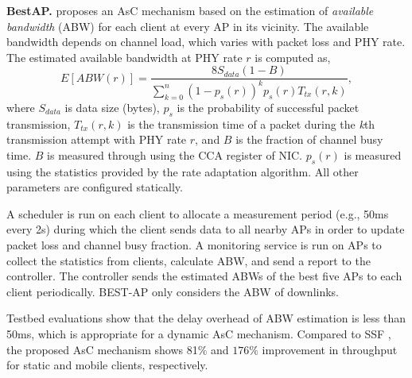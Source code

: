 \textbf{BestAP.}
\label{BEST-AP}
\cite{BEST-AP} proposes an AsC mechanism based on the estimation of \textit{available bandwidth} (ABW) for each client at every AP in its vicinity. 
The available bandwidth depends on channel load, which varies with packet loss and PHY rate. 
The estimated available bandwidth at PHY rate $r$ is computed as,
%
\begin{equation}
E[ABW(r)]=\frac{8S_{data}(1-B)}{\sum_{k=0}^{n}(1-p_s(r))^kp_s(r)T_{tx}(r,k)},
\end{equation}
%
where $S_{data}$ is data size (bytes), $p_s$ is the probability of successful packet transmission, $T_{tx}(r,k)$ is the transmission time of a packet during the \textit{k}th transmission attempt with PHY rate $r$, and $B$ is the fraction of channel busy time. 
$B$ is measured through using the CCA register of NIC.
$p_s(r)$ is measured using the statistics provided by the rate adaptation algorithm. 
All other parameters are configured statically. 

A scheduler is run on each client to allocate a measurement period (e.g., 50ms every 2s) during which the client sends data to all nearby APs in order to update packet loss and channel busy fraction. 
A monitoring service is run on APs to collect the statistics from clients, calculate ABW, and send a report to the controller.
The controller sends the estimated ABWs of the best five APs to each client periodically. 
BEST-AP only considers the ABW of downlinks.

Testbed evaluations show that the delay overhead of ABW estimation is less than 50ms, which is appropriate for a dynamic AsC mechanism.
Compared to SSF \cite{SSF}, the proposed AsC mechanism shows 81\% and $176\%$ improvement in throughput for static and mobile clients, respectively.


